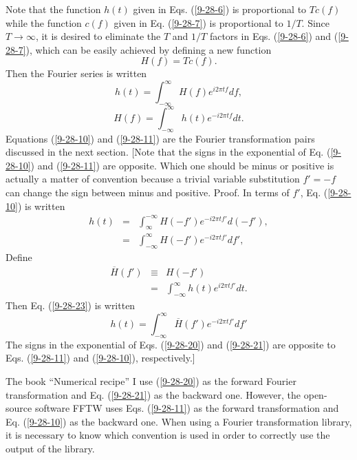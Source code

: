 \documentclass{article}
\begin{document}
Note that the function $h (t)$ given in Eqs. (\ref{9-28-6}) is proportional to
$T c (f)$ while the function $c (f)$ given in Eq. (\ref{9-28-7}) is
proportional to $1 / T$. Since $T \rightarrow \infty$, it is desired to
eliminate the $T$ and $1 / T$ factors in Eqs. (\ref{9-28-6}) and
(\ref{9-28-7}), which can be easily achieved by defining a new function
\begin{equation}
  H (f) = T c (f) .
\end{equation}
Then the Fourier series is written
\begin{equation}
  \label{9-28-10} h (t) = \int_{- \infty}^{\infty} H (f) e^{i 2 \pi t f} d f,
\end{equation}
\begin{equation}
  \label{9-28-11} H (f) = \int_{- \infty}^{\infty} h (t) e^{- i 2 \pi t f} d
  t.
\end{equation}
Equations (\ref{9-28-10}) and (\ref{9-28-11}) are the Fourier transformation
pairs discussed in the next section. [Note that the signs in the exponential
of Eq. (\ref{9-28-10}) and (\ref{9-28-11}) are opposite. Which one should be
minus or positive is actually a matter of convention because a trivial
variable substitution $f' = - f$ can change the sign between minus and
positive. Proof. In terms of $f'$, Eq. (\ref{9-28-10}) is written
\begin{eqnarray}
  h (t) & = & \int_{\infty}^{- \infty} H (- f') e^{- i 2 \pi t f'} d (- f'),
  \nonumber\\
  & = & \int_{- \infty}^{\infty} H (- f') e^{- i 2 \pi t f'} d f', 
  \label{9-28-23}
\end{eqnarray}
Define
\begin{eqnarray}
  \overline{H} (f') & \equiv & H (- f') \nonumber\\
  & = & \int_{- \infty}^{\infty} h (t) e^{i 2 \pi t f'} d t.  \label{9-28-20}
\end{eqnarray}
Then Eq. (\ref{9-28-23}) is written
\begin{equation}
  \label{9-28-21} h (t) = \int_{- \infty}^{\infty} \overline{H} (f') e^{- i 2
  \pi t f'} d f'
\end{equation}
The signs in the exponential of Eqs. (\ref{9-28-20}) and (\ref{9-28-21}) are
opposite to Eqs. (\ref{9-28-11}) and (\ref{9-28-10}), respectively.]

The book ``Numerical recipe''{\cite{press1992}} I use (\ref{9-28-20}) as the
forward Fourier transformation and Eq. (\ref{9-28-21}) as the backward one.
However, the open-source software FFTW uses Eqs. (\ref{9-28-11}) as the
forward transformation and Eq. (\ref{9-28-10}) as the backward one. When using
a Fourier transformation library, it is necessary to know which convention is
used in order to correctly use the output of the library.
\end{document}
